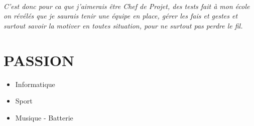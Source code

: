 \documentclass{article}
\begin{document}
\paragraph{C'est donc pour ca que j'aimerais être Chef de Projet, des tests fait à mon école on révélés que je saurais tenir une équipe en place, gérer les fais et gestes et surtout savoir la motiver en toutes situation, pour ne surtout pas perdre le fil.}

\clearpage
\part{PASSION}
\setcounter{section}{0}

\begin{itemize}

\item Informatique
\item Sport
\item Musique - Batterie

\end{itemize}
\end{document}

